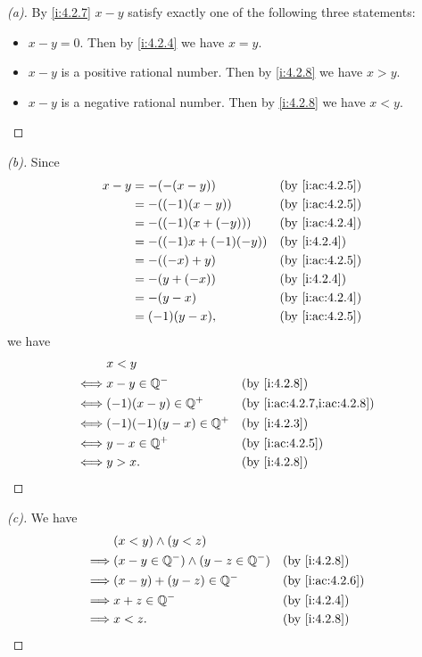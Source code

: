 \begin{proof}[(a)]
  By \cref{i:4.2.7} \(x - y\) satisfy exactly one of the following three statements:
  \begin{itemize}
    \item \(x - y = 0\).
          Then by \cref{i:4.2.4} we have \(x = y\).
    \item \(x - y\) is a positive rational number.
          Then by \cref{i:4.2.8} we have \(x > y\).
    \item \(x - y\) is a negative rational number.
          Then by \cref{i:4.2.8} we have \(x < y\).
  \end{itemize}
\end{proof}

\begin{proof}[(b)]
  Since
  \begin{align*}
    x - y & = -(-(x - y))           &  & \by{i:ac:4.2.5} \\
          & = -((-1) (x - y))       &  & \by{i:ac:4.2.5} \\
          & = -((-1) (x + (-y)))    &  & \by{i:ac:4.2.4} \\
          & = -((-1) x + (-1) (-y)) &  & \by{i:4.2.4}    \\
          & = -((-x) + y)           &  & \by{i:ac:4.2.5} \\
          & = -(y + (-x))           &  & \by{i:4.2.4}    \\
          & = -(y - x)              &  & \by{i:ac:4.2.4} \\
          & = (-1)(y - x),          &  & \by{i:ac:4.2.5}
  \end{align*}
  we have
  \begin{align*}
         & x < y                                                    \\
    \iff & x - y \in \Q^-           &  & \by{i:4.2.8}               \\
    \iff & (-1)(x - y) \in \Q^+     &  & \by{i:ac:4.2.7,i:ac:4.2.8} \\
    \iff & (-1)(-1)(y - x) \in \Q^+ &  & \by{i:4.2.3}               \\
    \iff & y - x \in \Q^+           &  & \by{i:ac:4.2.5}            \\
    \iff & y > x.                   &  & \by{i:4.2.8}
  \end{align*}
\end{proof}

\begin{proof}[(c)]
  We have
  \begin{align*}
             & (x < y) \land (y < z)                                        \\
    \implies & (x - y \in \Q^-) \land (y - z \in \Q^-) &  & \by{i:4.2.8}    \\
    \implies & (x - y) + (y - z) \in \Q^-              &  & \by{i:ac:4.2.6} \\
    \implies & x + z \in \Q^-                          &  & \by{i:4.2.4}    \\
    \implies & x < z.                                  &  & \by{i:4.2.8}
  \end{align*}
\end{proof}

